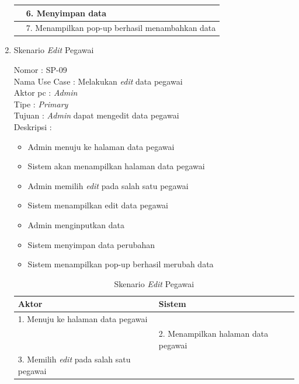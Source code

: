\begin{enumerate}
\begin{table}
\begin{tabular}{ | l | p{66.5mm} |}
		& 6.	Menyimpan data \\
		
		\hline
		
		& 7.	Menampilkan pop-up berhasil menambahkan data \\
		
		\hline
		
		
	\end{tabular}
\end{table}

\item Skenario \textit{Edit} Pegawai

Nomor \kern 3.6pc : SP-09 \\
Nama Use Case : Melakukan \textit{edit} data pegawai \\
Aktor  pc : \textit{Admin} \\
Tipe \kern 4.6pc : \textit{Primary} \\
Tujuan \kern 3.6pc : \textit{Admin} dapat mengedit data pegawai \\
Deskripsi \kern 2.5pc : 

\begin{itemize}
	\item Admin menuju ke halaman data pegawai
	\item Sistem akan menampilkan halaman data pegawai
	\item Admin memilih \textit{edit} pada salah satu pegawai
	\item Sistem menampilkan edit data pegawai
	\item Admin menginputkan data
	\item Sistem menyimpan data perubahan
	\item Sistem menampilkan pop-up berhasil merubah data
	
\end{itemize}

\begin{table}
	\caption{Skenario \textit{Edit} Pegawai}
	\centering
	\begin{tabular}{ | p{72mm} | p{56mm} |}
		\hline 
		\textbf{Aktor} & \textbf{Sistem} \\
		\hline
		
		1.	Menuju ke halaman data pegawai &  \\
		
		\hline
		
		&  2.	Menampilkan halaman data pegawai \\
		
		\hline
		
		3. Memilih \textit{edit} pada salah satu pegawai & \\
		

\end{tabular}
\end{table}
\end{enumerate}
